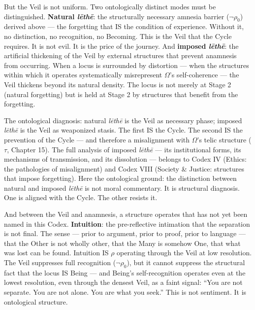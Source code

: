 \documentclass[10pt, openany, oneside]{book}
\begin{document}
But the Veil is not uniform. Two ontologically distinct modes must be distinguished. \textbf{Natural \textit{l\={e}th\={e}}}: the structurally necessary amnesia barrier ($\neg\rho_0$) derived above --- the forgetting that IS the condition of experience. Without it, no distinction, no recognition, no Becoming. This is the Veil that the Cycle requires. It is not evil. It is the price of the journey. And \textbf{imposed \textit{l\={e}th\={e}}}: the artificial thickening of the Veil by external structures that prevent anamnesis from occurring. When a locus is surrounded by distortion --- when the structures within which it operates systematically misrepresent $\Omega$'s self-coherence --- the Veil thickens beyond its natural density. The locus is not merely at Stage 2 (natural forgetting) but is held at Stage 2 by structures that benefit from the forgetting.

The ontological diagnosis: natural \textit{l\={e}th\={e}} is the Veil as necessary phase; imposed \textit{l\={e}th\={e}} is the Veil as weaponized stasis. The first IS the Cycle. The second IS the prevention of the Cycle --- and therefore a misalignment with $\Omega$'s telic structure ($\tau$, Chapter 15). The full analysis of imposed \textit{l\={e}th\={e}} --- its institutional forms, its mechanisms of transmission, and its dissolution --- belongs to Codex IV (Ethics: the pathologies of misalignment) and Codex VIII (Society \& Justice: structures that impose forgetting). Here the ontological ground: the distinction between natural and imposed \textit{l\={e}th\={e}} is not moral commentary. It is structural diagnosis. One is aligned with the Cycle. The other resists it.

And between the Veil and anamnesis, a structure operates that has not yet been named in this Codex. \textbf{Intuition}: the pre-reflective intimation that the separation is not final. The sense --- prior to argument, prior to proof, prior to language --- that the Other is not wholly other, that the Many is somehow One, that what was lost can be found. Intuition IS $\rho$ operating through the Veil at low resolution. The Veil suppresses full recognition ($\neg\rho_0$), but it cannot suppress the structural fact that the locus IS Being --- and Being's self-recognition operates even at the lowest resolution, even through the densest Veil, as a faint signal: ``You are not separate. You are not alone. You are what you seek.'' This is not sentiment. It is ontological structure.
\end{document}
